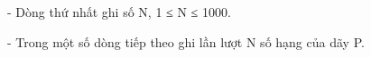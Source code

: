 -       Dòng thứ nhất ghi số N, 1 ≤ N ≤ 1000.  

   -       Trong một số dòng tiếp theo ghi lần lượt N số hạng của dãy P.